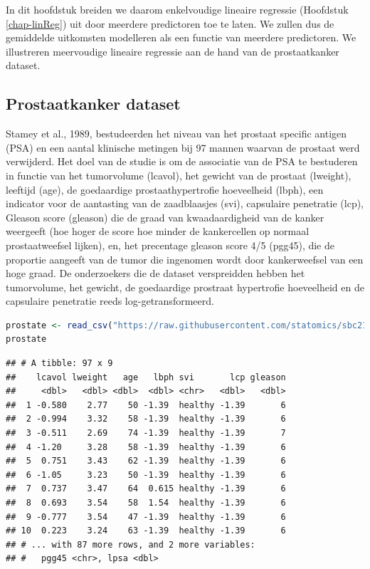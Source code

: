 \documentclass[
  12pt,dutch,coursenotes]{book}
\begin{document}
In dit hoofdstuk breiden we daarom enkelvoudige lineaire regressie (Hoofdstuk \ref{chap-linReg}) uit door meerdere predictoren toe te laten. We zullen dus de gemiddelde uitkomsten modelleren als een functie van meerdere predictoren.
We illustreren meervoudige lineaire regressie aan de hand van de prostaatkanker dataset.

\hypertarget{sec:prostate}{%
\subsection{Prostaatkanker dataset}\label{sec:prostate}}

Stamey et al., 1989, bestudeerden het niveau van het prostaat specific antigen (PSA) en een aantal klinische metingen bij 97 mannen waarvan de prostaat werd verwijderd.
Het doel van de studie is om de associatie van de PSA te bestuderen in functie van het tumorvolume (lcavol), het gewicht van de prostaat (lweight), leeftijd (age), de goedaardige prostaathypertrofie hoeveelheid (lbph), een indicator voor de aantasting van de zaadblaasjes (svi), capsulaire penetratie (lcp), Gleason score (gleason) die de graad van kwaadaardigheid van de kanker weergeeft (hoe hoger de score hoe minder de kankercellen op normaal prostaatweefsel lijken), en, het precentage gleason score 4/5 (pgg45), die de proportie aangeeft van de tumor die ingenomen wordt door kankerweefsel van een hoge graad. De onderzoekers die de dataset verspreidden hebben het tumorvolume, het gewicht, de goedaardige prostraat hypertrofie hoeveelheid en de capsulaire penetratie reeds log-getransformeerd.

\begin{lstlisting}[language=R]
prostate <- read_csv("https://raw.githubusercontent.com/statomics/sbc21/master/data/prostate.csv")
prostate
\end{lstlisting}

\begin{lstlisting}
## # A tibble: 97 x 9
##    lcavol lweight   age   lbph svi       lcp gleason
##     <dbl>   <dbl> <dbl>  <dbl> <chr>   <dbl>   <dbl>
##  1 -0.580    2.77    50 -1.39  healthy -1.39       6
##  2 -0.994    3.32    58 -1.39  healthy -1.39       6
##  3 -0.511    2.69    74 -1.39  healthy -1.39       7
##  4 -1.20     3.28    58 -1.39  healthy -1.39       6
##  5  0.751    3.43    62 -1.39  healthy -1.39       6
##  6 -1.05     3.23    50 -1.39  healthy -1.39       6
##  7  0.737    3.47    64  0.615 healthy -1.39       6
##  8  0.693    3.54    58  1.54  healthy -1.39       6
##  9 -0.777    3.54    47 -1.39  healthy -1.39       6
## 10  0.223    3.24    63 -1.39  healthy -1.39       6
## # ... with 87 more rows, and 2 more variables:
## #   pgg45 <chr>, lpsa <dbl>
\end{lstlisting}
\end{document}

